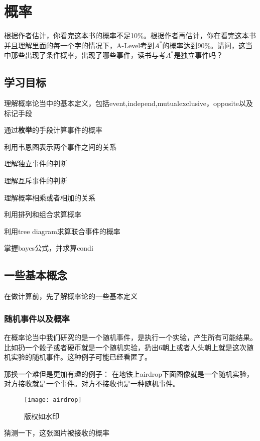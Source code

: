 \chapter{概率}
根据作者估计，你看完这本书的概率不足10\%。根据作者再估计，你在看完这本书并且理解里面的每一个字的情况下，A-Level考到$A^*$的概率达到90\%。请问，这当中那些出现了条件概率，出现了哪些事件，读书与考$A^*$是独立事件吗？

\section*{学习目标}
\begin{todolist}
	\item 理解概率论当中的基本定义，包括\gls{event},\gls{independ},\gls{mutualexclusive}，\gls{opposite}以及标记手段
	\item 通过\textbf{枚举}的手段计算事件的概率
	\item 利用韦恩图表示两个事件之间的关系
	\item 理解独立事件的判断
	\item 理解互斥事件的判断
	\item 理解概率相乘或者相加的关系
	\item 利用排列和组合求算概率
	\item 利用tree diagram求算联合事件的概率
	\item 掌握\gls{bayes}公式，并求算\gls{condi}
\end{todolist}

\clearpage

\section{一些基本概念}
在做计算前，先了解概率论的一些基本定义

\subsection*{随机事件以及概率}
在概率论当中我们研究的是一个随机事件，是执行一个实验，产生所有可能结果。比如扔一个骰子或者硬币就是一个随机实验，扔出6朝上或者人头朝上就是这次随机实验的随机事件。这种例子可能已经看匿了。

那换一个难但是更加有趣的例子：
在地铁上airdrop下面图像就是一个随机实验，对方接收就是一个事件。对方不接收也是一种随机事件。
\begin{figure}[H]
\centering
\texttt{[image: airdrop]}
\caption{版权如水印}
\end{figure}
猜测一下，这张图片被接收的概率

